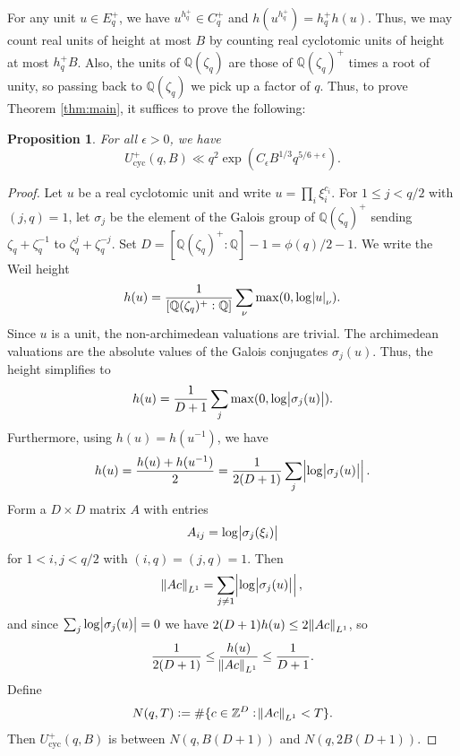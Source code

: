 \documentclass[10pt,a4paper]{amsart}
\newtheorem{prop}{Proposition}
\newcommand{\bQ}{\mathbb{Q}}
\newcommand{\bZ}{\mathbb{Z}}
\DeclareMathOperator{\cyc}{cyc}
\begin{document}
For any unit $u \in E_q^+$, we have $u^{h_q^+} \in C_q^+$ and $h(u^{h_q^+}) = h_q^+ h(u)$. Thus, we may count real units of height at most $B$ by counting real cyclotomic units of height at most $h_q^+ B$. Also, the units of $\bQ(\zeta_q)$ are those of $\bQ(\zeta_q)^+$ times a root of unity, so passing back to $\bQ(\zeta_q)$ we pick up a factor of $q$. Thus, to prove Theorem \ref{thm:main}, it suffices to prove the following:

\begin{prop}

    For all $\epsilon > 0$, we have $$U^+_{\cyc}(q,B) \ll q^2 \exp(C_{\epsilon} B^{1/3} q^{5/6+\epsilon}).$$
\end{prop}
\begin{proof}


Let $u$ be a real cyclotomic unit and write $u = \prod_i \xi_i^{c_i}$. For $1 \leq j < q/2$ with $(j,q) = 1$, let $\sigma_j$ be the element of the Galois group of $\bQ(\zeta_q)^+$ sending $\zeta_q+\zeta_q^{-1}$ to $\zeta_q^j+\zeta_q^{-j}$. Set $D=[\bQ(\zeta_q)^+ : \bQ]-1 = \phi(q)/2-1$. We write the Weil height
\[
h(u) = \frac{1}{[\bQ(\zeta_q)^+ : \bQ]} \sum_{\nu} \max(0, \log \abs{u}_\nu).
\]
Since $u$ is a unit, the non-archimedean valuations are trivial. The archimedean valuations are the absolute values of the Galois conjugates $\sigma_j(u)$. Thus, the height simplifies to
\[
h(u) = \frac{1}{D+1} \sum_j \max(0, \log \abs{\sigma_j(u)}).
\]
Furthermore, using $h(u) = h(u^{-1})$, we have
\begin{align*}
h(u) = \frac{h(u) + h(u^{-1})}{2} = \frac{1}{2(D+1)} \sum_{j} \abs{\log \abs{\sigma_j(u)}}.
\end{align*}
Form a $D \times D$ matrix $A$ with entries
\[
A_{ij} = \log \abs{\sigma_j(\xi_i)}
\]
for $1 < i, j < q/2$ with $(i,q)=(j,q)=1$. Then
\[
\norm{A c}_{L^1} = \sum_{j \neq 1} \abs{\log \abs{\sigma_j(u)}},
\]
and since $\sum_j \log \abs{\sigma_j(u)} = 0$ we have $2(D+1)h(u) \leq 2\norm{A c}_{L^1}$, so 
\[
\frac{1}{2(D+1)}
\leq \frac{h(u)}{\norm{A c}_{L^1}} \leq \frac{1}{D+1}.
\]
Define
\begin{align*}
N(q,T) :=
\# \{ c \in \bZ^D : \norm{A c}_{L^1} < T \}.
\end{align*}
Then $U^+_{\cyc}(q,B)$ is between $N(q,B(D+1))$ and $N(q,2B(D+1))$.


\end{proof}
\end{document}
